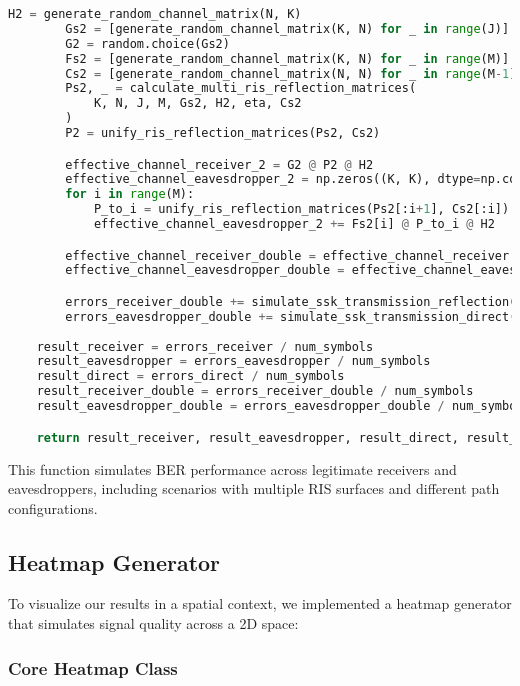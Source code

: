\begin{lstlisting}[language=python, caption={BER Simulation}]
        H2 = generate_random_channel_matrix(N, K)
        Gs2 = [generate_random_channel_matrix(K, N) for _ in range(J)]
        G2 = random.choice(Gs2)
        Fs2 = [generate_random_channel_matrix(K, N) for _ in range(M)]
        Cs2 = [generate_random_channel_matrix(N, N) for _ in range(M-1)]
        Ps2, _ = calculate_multi_ris_reflection_matrices(
            K, N, J, M, Gs2, H2, eta, Cs2
        )
        P2 = unify_ris_reflection_matrices(Ps2, Cs2)

        effective_channel_receiver_2 = G2 @ P2 @ H2
        effective_channel_eavesdropper_2 = np.zeros((K, K), dtype=np.complex128) # F @ P @ H
        for i in range(M):
            P_to_i = unify_ris_reflection_matrices(Ps2[:i+1], Cs2[:i])
            effective_channel_eavesdropper_2 += Fs2[i] @ P_to_i @ H2

        effective_channel_receiver_double = effective_channel_receiver + effective_channel_receiver_2
        effective_channel_eavesdropper_double = effective_channel_eavesdropper + effective_channel_eavesdropper_2

        errors_receiver_double += simulate_ssk_transmission_reflection(K, effective_channel_receiver_double, sigma_sq)
        errors_eavesdropper_double += simulate_ssk_transmission_direct(K, B, effective_channel_eavesdropper_double, sigma_sq)
    
    result_receiver = errors_receiver / num_symbols
    result_eavesdropper = errors_eavesdropper / num_symbols
    result_direct = errors_direct / num_symbols
    result_receiver_double = errors_receiver_double / num_symbols
    result_eavesdropper_double = errors_eavesdropper_double / num_symbols

    return result_receiver, result_eavesdropper, result_direct, result_receiver_double, result_eavesdropper_double
\end{lstlisting}

This function simulates BER performance across legitimate receivers and eavesdroppers, including scenarios with multiple RIS surfaces and different path configurations.

\subsection{Heatmap Generator}

To visualize our results in a spatial context, we implemented a heatmap generator that simulates signal quality across a 2D space:

\subsubsection{Core Heatmap Class}

